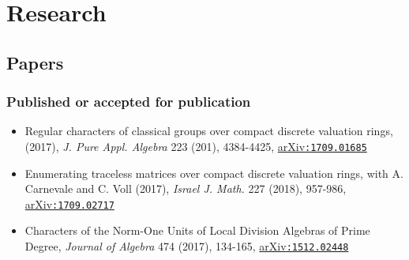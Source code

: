 \documentclass[leqno,10pt]{article}
\begin{document}
\section*{Research}
\subsection*{Papers}
\subsubsection*{Published or accepted for publication}
\begin{itemize}
\item {Regular characters of classical groups over compact discrete valuation rings}, (2017), \textit{J. Pure Appl. Algebra} 223 (201), 4384-4425, \href{https://arxiv.org/abs/1709.01685}{arXiv\texttt{:1709.01685}}
\item {Enumerating traceless matrices over compact discrete valuation rings}, with A. Carnevale and C. Voll (2017), \textit{Israel J. Math.} 227 (2018), 957-986, \href{https://arxiv.org/abs/1709.02717}{arXiv\texttt{:1709.02717}}
\item {Characters of the Norm-One Units of Local Division Algebras of Prime Degree}, \textit{Journal of Algebra} 474 (2017), 134-165, \href{https://arxiv.org/abs/1512.02448}{arXiv\texttt{:1512.02448}}

\end{itemize}

\end{document}
